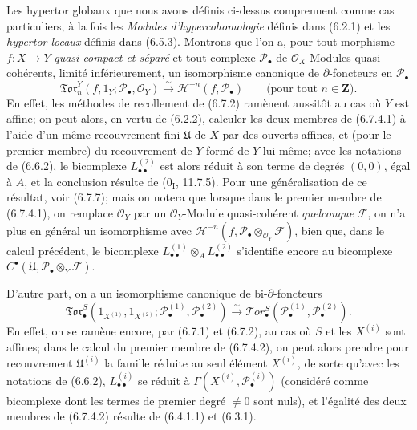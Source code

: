 \begin{remark}[6.7.4]
Les hypertor globaux que nous avons définis ci-dessus comprennent comme cas
particuliers, à la fois les \emph{Modules d'hypercohomologie} définis dans
(6.2.1) et les \emph{hypertor locaux} définis dans (6.5.3). Montrons que l'on
a, pour tout morphisme $f:X\to Y$ \emph{quasi-compact et séparé} et tout
complexe $\mathscr P_\bullet$ de $\mathscr O_X$-Modules quasi-cohérents,
limité inférieurement, un isomorphisme canonique de $\partial$-foncteurs en
$\mathscr P_\bullet$
\[
  \mathfrak{Tor}_n^Y(f,1_Y;\mathscr P_\bullet,\mathscr O_Y)
  \xrightarrow{\sim}
  \mathscr H^{-n}(f,\mathscr P_\bullet)
  \qquad\text{(pour tout $n\in\mathbf Z$)}.
  \tag{6.7.4.1}\label{III.6.7.4.1.fr}
\]
En effet, les méthodes de recollement de (6.7.2) ramènent aussitôt au cas où
$Y$ est affine; on peut alors, en vertu de (6.2.2), calculer les deux membres
de (6.7.4.1) à l'aide d'un même recouvrement fini $\mathfrak U$ de $X$ par des
ouverts affines, et (pour le premier membre) du recouvrement de $Y$ formé de
$Y$ lui-même; avec les notations de (6.6.2), le bicomplexe
$L_{\bullet\bullet}^{(2)}$ est alors réduit à son terme de degrés $(0,0)$,
égal à $A$, et la conclusion résulte de ($0_{\mathrm I}$, 11.7.5). Pour une
généralisation de ce résultat, voir (6.7.7); mais on notera que lorsque dans
le premier membre de (6.7.4.1), on remplace $\mathscr O_Y$ par un
$\mathscr O_Y$-Module quasi-cohérent \emph{quelconque} $\mathscr F$, on n'a
plus en général un isomorphisme avec
$\mathscr H^{-n}(f,\mathscr P_\bullet\otimes_{\mathscr O_Y}\mathscr F)$, bien
que, dans le calcul précédent, le bicomplexe
$L_{\bullet\bullet}^{(1)}\otimes_A L_{\bullet\bullet}^{(2)}$ s'identifie
encore au bicomplexe
$C^\bullet(\mathfrak U,\mathscr P_\bullet\otimes_Y\mathscr F)$.

D'autre part, on a un isomorphisme canonique de bi-$\partial$-foncteurs
\[
  \mathfrak{Tor}_\bullet^S
  (1_{X^{(1)}},1_{X^{(2)}};
   \mathscr P_\bullet^{(1)},\mathscr P_\bullet^{(2)})
  \xrightarrow{\sim}
  \mathscr{T}\!or_\bullet^S
  (\mathscr P_\bullet^{(1)},\mathscr P_\bullet^{(2)}).
  \tag{6.7.4.2}\label{III.6.7.4.2.fr}
\]
En effet, on se ramène encore, par (6.7.1) et (6.7.2), au cas où $S$ et les
$X^{(i)}$ sont affines; dans le calcul du premier membre de (6.7.4.2), on peut
alors prendre pour
recouvrement $\mathfrak U^{(i)}$ la famille réduite au seul élément $X^{(i)}$,
de sorte qu'avec les notations de (6.6.2), $L_{\bullet\bullet}^{(i)}$ se réduit
à $\Gamma(X^{(i)},\mathscr P_\bullet^{(i)})$ (considéré comme bicomplexe dont
les termes de premier degré $\ne0$ sont nuls), et l'égalité des deux membres
de (6.7.4.2) résulte de (6.4.1.1) et (6.3.1).
\end{remark}

